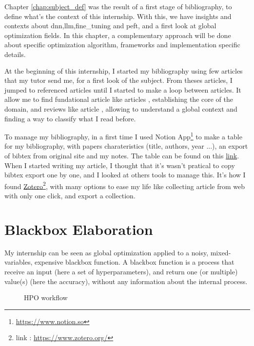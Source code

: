 Chapter \ref{chap:subject_def} was the result of a first stage of bibliography, to define what's the context of this internship. With this, we have insights and contexts about \acrshort{dnn},\acrshort{llm},\gls{fine_tuning} and \acrshort{peft}, and a first look at global optimization fields. In this chapter, a complementary approach will be done about specific optimization algorithm, frameworks and implementation specific details. 

At the beginning of this internship, I started my bibliography using few articles that my tutor send me, for a first look of the subject. From theses articles, I jumped to referenced articles until I started to make a loop between articles. It allow me to find fundational article like articles \cite{vaswani_attention_2017,talbi_automated_2021}, establishing the core of the domain, and reviews like article \cite{elsken_neural_2019,talbi_automated_2021}, allowing to understand a global context and finding a way to classify what I read before.

To manage my bibliography, in a first time I used Notion App\footnote{\href{https://www.notion.so}{https://www.notion.so}} to make a table for my bibliography, with papers charateristics (title, authors, year ...), an export of bibtex from original site and my notes. The table can be found on this \href{https://ribbon-crown-5f6.notion.site/6539799af4a24b32b6d4b91c4e07de49?v=b1542338391647aaa38cc8bb4ad1d5d8&pvs=4}{link}. When I started writing my article, I thought that it's wasn't pratical to copy bibtex export one by one, and I looked at others tools to manage this. It's how I found \href{https://www.zotero.org/}{Zotero}\footnote{link : \href{https://www.zotero.org/}{https://www.zotero.org/}}, with many options to ease my life like collecting article from web with only one click, and export a collection.

\section{Blackbox Elaboration}
\label{sec:blackbox}
My internship can be seen as global optimization applied to a noisy, mixed-variables, expensive blackbox function. A blackbox function is a process that receive an input (here a set of hyperparameters), and return one (or multiple) value(s) (here the accuracy), without any information about the internal process. 


\begin{figure}[h]
    \centering
    
    \caption{HPO workflow}
    \label{fig:hpo_workflow}
\end{figure}

